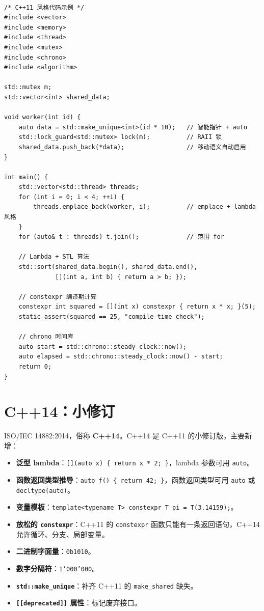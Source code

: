 \documentclass[12pt,a4paper,fontset=fandol]{ctexbook}
\newcommand{\cppxxlabel}[1]{%
  \tcbox[on line,colback=cppheadbg,colframe=cppheadbg,
    boxrule=0pt,arc=1pt,left=2pt,right=2pt,top=1pt,bottom=1pt,
    colupper=white,fontupper=\scriptsize\bfseries]{#1}}
\newcommand{\yearlabel}[1]{%
  \tcbox[on line,colback=yearheadbg,colframe=yearheadbg,
    boxrule=0pt,arc=1pt,left=3pt,right=3pt,top=1pt,bottom=1pt,
    colupper=white,fontupper=\scriptsize\bfseries]{#1}}
\newcommand{\kw}[1]{\texttt{#1}}
\newcommand{\yrlbl}[1]{\yearlabel{#1}}
\begin{document}
\cppxxlabel{C++11}\ \begin{lstlisting}
/* C++11 风格代码示例 */
#include <vector>
#include <memory>
#include <thread>
#include <mutex>
#include <chrono>
#include <algorithm>

std::mutex m;
std::vector<int> shared_data;

void worker(int id) {
    auto data = std::make_unique<int>(id * 10);   // 智能指针 + auto
    std::lock_guard<std::mutex> lock(m);          // RAII 锁
    shared_data.push_back(*data);                 // 移动语义自动启用
}

int main() {
    std::vector<std::thread> threads;
    for (int i = 0; i < 4; ++i) {
        threads.emplace_back(worker, i);          // emplace + lambda 风格
    }
    for (auto& t : threads) t.join();             // 范围 for

    // Lambda + STL 算法
    std::sort(shared_data.begin(), shared_data.end(),
              [](int a, int b) { return a > b; });

    // constexpr 编译期计算
    constexpr int squared = [](int x) constexpr { return x * x; }(5);
    static_assert(squared == 25, "compile-time check");

    // chrono 时间库
    auto start = std::chrono::steady_clock::now();
    auto elapsed = std::chrono::steady_clock::now() - start;
    return 0;
}
\end{lstlisting}

\section{C++14：小修订}

\yrlbl{2014} ISO/IEC 14882:2014，俗称 \textbf{C++14}。C++14 是 C++11 的小修订版，主要新增：

\begin{itemize}
  \item \textbf{泛型 lambda}：\kw{[](auto x) \{ return x * 2; \}}，lambda 参数可用 \kw{auto}。
  \item \textbf{函数返回类型推导}：\kw{auto f() \{ return 42; \}}，函数返回类型可用 \kw{auto} 或 \kw{decltype(auto)}。
  \item \textbf{变量模板}：\kw{template<typename T> constexpr T pi = T(3.14159);}。
  \item \textbf{放松的 \kw{constexpr}}：C++11 的 \kw{constexpr} 函数只能有一条返回语句，C++14 允许循环、分支、局部变量。
  \item \textbf{二进制字面量}：\kw{0b1010}。
  \item \textbf{数字分隔符}：\kw{1'000'000}。
  \item \textbf{\kw{std::make\_unique}}：补齐 C++11 的 \kw{make\_shared} 缺失。
  \item \textbf{\kw{[[deprecated]]} 属性}：标记废弃接口。
\end{itemize}
\end{document}
